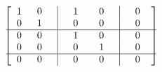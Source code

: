 \begin{example}
	\begin{equation}
		\begin{bmatrix}
			\hspace{2mm} 1 & \hspace{2mm} 0 \hspace{2mm} & \vline & \hspace{2mm}  1 \hspace{2mm} & \hspace{2mm} 0 \hspace{2mm} & \vline & \hspace{2mm} 0 \hspace{4mm} \\
			\hspace{2mm} 0 & \hspace{2mm} 1 \hspace{2mm} & \vline & \hspace{2mm} 0 \hspace{2mm} & \hspace{2mm} 0 \hspace{2mm} & \vline & \hspace{2mm} 0 \hspace{4mm} \\
			\hline
			\hspace{2mm} 0 & \hspace{2mm} 0 \hspace{2mm} & \vline & \hspace{2mm} 1 \hspace{2mm} & \hspace{2mm} 0 \hspace{2mm} & \vline & \hspace{2mm} 0 \hspace{4mm} \\
			\hspace{2mm} 0 & \hspace{2mm} 0 \hspace{2mm} & \vline & \hspace{2mm} 0 \hspace{2mm} & \hspace{2mm} 1 \hspace{2mm} & \vline & \hspace{2mm} 0 \hspace{4mm} \\
			\hline
			\hspace{2mm} 0 & \hspace{2mm} 0 \hspace{2mm} & \vline & \hspace{2mm} 0 \hspace{2mm} & \hspace{2mm} 0 \hspace{2mm} & \vline & \hspace{2mm} 0 \hspace{4mm} \\
		\end{bmatrix}
	\end{equation}
	

\end{example}
